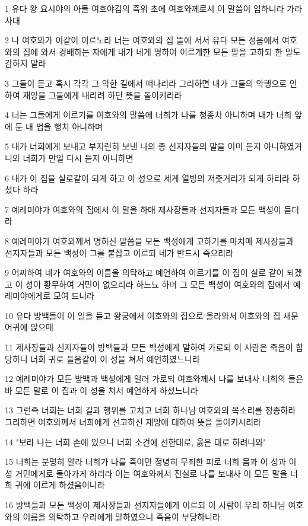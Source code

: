 \par 1 유다 왕 요시야의 아들 여호야김의 즉위 초에 여호와께로서 이 말씀이 임하니라 가라사대
\par 2 나 여호와가 이같이 이르노라 너는 여호와의 집 뜰에 서서 유다 모든 성읍에서 여호와의 집에 와서 경배하는 자에게 내가 네게 명하여 이르게한 모든 말을 고하되 한 말도 감하지 말라
\par 3 그들이 듣고 혹시 각각 그 악한 길에서 떠나리라 그리하면 내가 그들의 악행으로 인하여 재앙을 그들에게 내리려 하던 뜻을 돌이키리라
\par 4 너는 그들에게 이르기를 여호와의 말씀에 너희가 나를 청종치 아니하며 내가 너희 앞에 둔 내 법을 행치 아니하며
\par 5 내가 너희에게 보내고 부지런히 보낸 나의 종 선지자들의 말을 이미 듣지 아니하였거니와 너희가 만일 다시 듣지 아니하면
\par 6 내가 이 집을 실로같이 되게 하고 이 성으로 세계 열방의 저줏거리가 되게 하리라 하셨다 하라
\par 7 예레미야가 여호와의 집에서 이 말을 하매 제사장들과 선지자들과 모든 백성이 듣더라
\par 8 예레미야가 여호와께서 명하신 말씀을 모든 백성에게 고하기를 마치매 제사장들과 선지자들과 모든 백성이 그를 붙잡고 이르되 네가 반드시 죽으리라
\par 9 어찌하여 네가 여호와의 이름을 의탁하고 예언하여 이르기를 이 집이 실로 같이 되겠고 이 성이 황무하여 거민이 없으리라 하느뇨 하며 그 모든 백성이 여호와의 집에서 예레미야에게로 모여 드니라
\par 10 유다 방백들이 이 일을 듣고 왕궁에서 여호와의 집으로 올라와서 여호와의 집 새문 어귀에 앉으매
\par 11 제사장들과 선지자들이 방백들과 모든 백성에게 말하여 가로되 이 사람은 죽음이 합당하니 너희 귀로 들음같이 이 성을 쳐서 예언하였느니라
\par 12 예레미야가 모든 방백과 백성에게 일러 가로되 여호와께서 나를 보내사 너희의 들은 바 모든 말로 이 집과 이 성을 쳐서 예언하게 하셨느니라
\par 13 그런즉 너희는 너희 길과 행위를 고치고 너희 하나님 여호와의 목소리를 청종하라 그리하면 여호와께서 너희에게 선고하신 재앙에 대하여 뜻을 돌이키시리라
\par 14 "보라 나는 너희 손에 있으니 너희 소견에 선한대로, 옳은 대로 하려니와"
\par 15 너희는 분명히 알라 너희가 나를 죽이면 정녕히 무죄한 피로 너희 몸과 이 성과 이 성 거민에게로 돌아가게 하리라 이는 여호와께서 진실로 나를 보내사 이 모든 말을 너희 귀에 이르게 하셨음이니라
\par 16 방백들과 모든 백성이 제사장들과 선지자들에게 이르되 이 사람이 우리 하나님 여호와의 이름을 의탁하고 우리에게 말하였으니 죽음이 부당하니라
